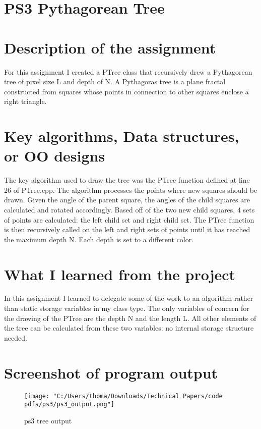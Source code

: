 \documentclass[12pt]{article}
\begin{document}
\section*{PS3 Pythagorean Tree }
\section[1]{Description of the assignment}
\hfill\begin{minipage}{\dimexpr\textwidth-1cm}
For this assignment I created a PTree class that recursively drew a Pythagorean tree of pixel size L and depth of N. A Pythagoras tree is a plane fractal constructed from squares whose points in connection to other squares enclose a right triangle.
\end{minipage}

\section[2]{Key algorithms, Data structures, or OO designs}
\hfill\begin{minipage}{\dimexpr\textwidth-1cm}
The key algorithm used to draw the tree was the PTree function defined at line 26 of PTree.cpp. The algorithm processes the points where new squares should be drawn. Given the angle of the parent square, the angles of the child squares are calculated and rotated accordingly. Based off of the two new child squares, 4 sets of points are calculated: the left child set and right child set. The PTree function is then recursively called on the left and right sets of points until it has reached the maximum depth N. Each depth is set to a different color.
\end{minipage}

\section[3]{What I learned from the project}
\hfill\begin{minipage}{\dimexpr\textwidth-1cm}
In this assignment I learned to delegate some of the work to an algorithm rather than static storage variables in my class type. The only variables of concern for the drawing of the PTree are the depth N and the length L. All other elements of the tree can be calculated from these two variables: no internal storage structure needed.
\end{minipage}

\section[4]{Screenshot of program output}
\begin{figure}[H]
  \centering
  \texttt{[image: "C:/Users/thoma/Downloads/Technical Papers/code pdfs/ps3/ps3\_output.png"]}
  \caption{ps3 tree output}
  \label{fig:ps3_output}
\end{figure}
\end{document}
